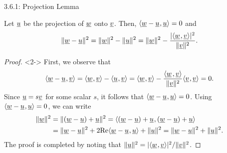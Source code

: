 \documentclass[10pt,english,aspectratio=169]{beamer}
\begin{document}
\begin{frame}{3.6.1: Projection Lemma}

\vspace{-2mm}

\begin{lemma}
Let $\underline{u}$ be the projection of $\underline{w}$ onto $\underline{v}$.
Then, ${\langle  \underline{w}-\underline{u}  \mskip1mu ,  \underline{u}  \rangle} = 0$ and \vspace{-2mm}
\[ \|\underline{w}-\underline{u}\|^2 =  \|\underline{w}\|^2 - \| \underline{u} \|^2 = \|\underline{w}\|^2 - \frac{|{\langle  \underline{w}  \mskip1mu ,  \underline{v}  \rangle}|^2}{\|\underline{v}\|^2}. \]
\end{lemma}

\vspace{-1mm}

\begin{proof}<2->
First, we observe that \vspace{-3mm}
\[ \tinner{ \vecnot{w} - \vecnot{u} }{ \vecnot{v} } = \tinner{ \vecnot{w} }{ \vecnot{v} } - \tinner{ \vecnot{u} }{ \vecnot{v} } = \tinner{ \vecnot{w} }{ \vecnot{v} } - \frac{\inner{ \vecnot{w} }{ \vecnot{v} }}{\|\vecnot{v}\|^2} \tinner{ \vecnot{v} }{ \vecnot{v} } = 0. \vspace{-1.5mm} \]
Since $\underline{u} = s \underline{v}$ for some scalar $s$, it follows that ${\langle  \underline{w}-\underline{u}  \mskip1mu ,  \underline{u}  \rangle} =  0$.
Using ${\langle  \underline{w}-\underline{u}  \mskip1mu ,  \underline{u}  \rangle} = 0$, we can write \vspace{-2mm}
\begin{align*}
\|\vecnot{w}\|^2 &= \|(\vecnot{w}-\vecnot{u})+\vecnot{u}\|^2
= \tinner{ (\vecnot{w}-\vecnot{u})+\vecnot{u}}{(\vecnot{w}-\vecnot{u})+\vecnot{u}} \\
&= \|\vecnot{w}-\vecnot{u}\|^2 + 2 \Real \tinner{ \vecnot{w}-\vecnot{u} }{ \vecnot{u} } + \|\vecnot{u}\|^2
= \|\vecnot{w}-\vecnot{u}\|^2 + \|\vecnot{u}\|^2. \vspace{-1mm}
\end{align*}
The proof is completed by noting that $\|\underline{u}\|^2 = |{\langle  \underline{w}  \mskip1mu ,  \underline{v}  \rangle}|^2 / \|\underline{v}\|^2$.
\end{proof}

\end{frame}
\end{document}
